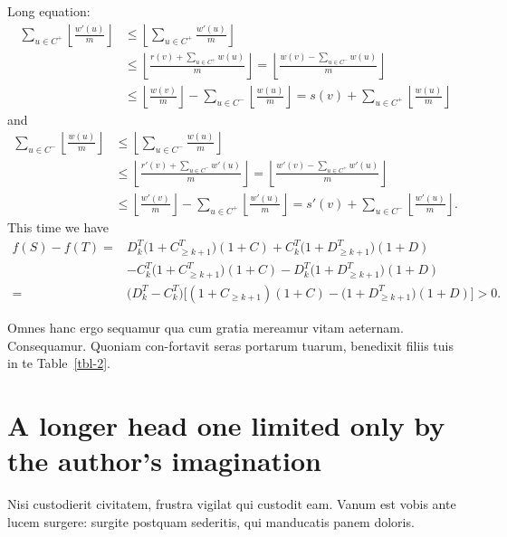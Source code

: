 \documentclass[linenumber]{jdsart}
\theoremstyle{plain}
\theoremstyle{remark}
\theoremstyle{definition}
\begin{document}
Long equation:
%
\begin{align}
\sum_{u\in C^+}\left\lfloor{\frac{w'(u)}{m}} \right\rfloor
    & \le \left\lfloor\sum_{u\in C^+} {\frac{w'(u)}{m}} \right\rfloor \nonumber \\
    & \le \left\lfloor{\frac{r(v)+\sum_{u\in C^+} w(u)}{m}} \right \rfloor = \left\lfloor{\frac{w(v)-\sum_{u\in C^-} w(u)}{m}} \right \rfloor \nonumber \\
    & \le \left\lfloor{\frac{w(v)}{m}} \right\rfloor -\sum_{u\in C^-}\left\lfloor{\frac{w(u)}{m}} \right\rfloor = s(v)+\sum_{u\in C^+}\left\lfloor{\frac{w(u)}{m}} \right\rfloor
\end{align}
%
and
%
\begin{align}
\sum_{u\in C^-}\left\lfloor{\frac{w(u)}{m}} \right\rfloor
    & \le \left\lfloor\sum_{u\in C^-} {\frac{w(u)}{m}} \right\rfloor \nonumber \\
    & \le \left\lfloor{\frac{r'(v)+\sum_{u\in C^-} w'(u)}{m}} \right \rfloor = \left\lfloor{\frac{w'(v)-\sum_{u\in C^+} w'(u)}{m}} \right\rfloor \nonumber\\
    & \le \left\lfloor{\frac{w'(v)}{m}} \right\rfloor -\sum_{u\in C^+}\left\lfloor{\frac{w'(u)}{m}} \right\rfloor = s'(v)+\sum _{u\in C^-}\left\lfloor{\frac{w'(u)}{m}} \right\rfloor .
\end{align}
%
This time we have
%
\begin{align}
f(S)-f(T) = {} & D_k^T\bigl(1+C_{\geq k+1}^T\bigr)(1 + C) + C_k^T\bigl(1+D_{\geq k+1}^T\bigr)(1 + D) \nonumber    \\
            {} & - C_k^T\bigl(1+C_{\geq k+1}^T\bigr)(1 + C) - D_k^T\bigl (1+D_{\geq k+1}^T\bigr)(1 + D) \nonumber \\
          = {} & \bigl(D_k^T-C_k^T\bigr)\bigl[(1+C_{\geq k+1})(1+C)-\bigl (1+D_{\geq k+1}^T\bigr)(1+D)\bigr]>0.
\end{align}

Omnes hanc ergo sequamur qua cum gratia mereamur vitam aeternam.
Consequamur. Quoniam con-fortavit seras portarum tuarum,
benedixit filiis tuis in te Table~\ref{tbl-2}.


\section{A longer head one limited only by the author's imagination}

Nisi custodierit civitatem, frustra vigilat qui custodit eam. Vanum
est vobis ante lucem surgere: surgite postquam sederitis, qui
manducatis panem doloris. 
\end{document}
